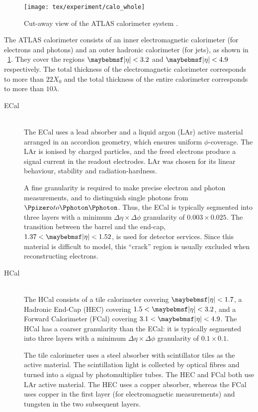\begin{figure}
	\texttt{[image: tex/experiment/calo\_whole]}
	\caption{Cut-away view of the ATLAS calorimeter system \cite{ATLAS-detector}.}
	\label{fig:calorimeters}
\end{figure}

The ATLAS calorimeter consists of an inner electromagnetic calorimeter (for electrons and 
photons) and an outer hadronic calorimeter (for jets), as shown in 
\Figure~\ref{fig:calorimeters}. They cover the regions $\mods{\eta} < 3.2$ and 
$\mods{\eta} < 4.9$ respectively. The total thickness of the electromagnetic calorimeter 
corresponds to more than $22 X_0$ and the total thickness of the entire calorimeter 
corresponds to more than $10 \lambda$.
\begin{description}
\item[\ac{ECal}] \hfill \\
	The \ac{ECal} uses a lead absorber and a liquid argon (LAr) active material arranged 
	in an accordion geometry, which ensures uniform $\phi$-coverage. The LAr is ionised 
	by charged particles, and the freed electrons produce a signal current in the readout 
	electrodes. LAr was chosen for its linear behaviour, stability and radiation-hardness.

	A fine granularity is required to make precise electron and photon measurements, and 
	to distinguish single photons from $\HepProcess{\Ppizero \HepTo \Pphoton \Pphoton}$. 
	Thus, the \ac{ECal} is typically segmented into three layers with a minimum 
	$\Delta\eta\times\Delta\phi$ granularity of $0.003 \times 0.025$. The transition 
	between the barrel and the end-cap, $1.37 < \mods{\eta} < 1.52$, is used for detector 
	services. Since this material is difficult to model, this ``crack'' region is usually 
	excluded when reconstructing electrons.
\item[\ac{HCal}] \hfill \\
	The \ac{HCal} consists of a tile calorimeter covering $\mods{\eta} < 1.7$, a Hadronic 
	End-Cap (HEC) covering $1.5 < \mods{\eta} < 3.2$, and a Forward Calorimeter (FCal) 
	covering $3.1 < \mods{\eta} < 4.9$. The \ac{HCal} has a coarser granularity than the
	\ac{ECal}: it is typically segmented into three layers with a minimum 
	$\Delta\eta\times\Delta\phi$ granularity of $0.1 \times 0.1$.

	The tile calorimeter uses a steel absorber with scintillator tiles as the active 
	material. The scintillation light is collected by optical fibres and turned into a 
	signal by photomultiplier tubes. The HEC and FCal both use LAr active material.
	The HEC uses a copper absorber, whereas the FCal uses copper in the first layer (for 
	electromagnetic measurements) and tungsten in the two subsequent layers.
\end{description}



